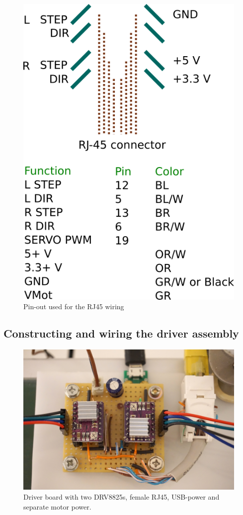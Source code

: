 \documentclass[a4paper,10pt]{article}
\begin{document}
\begin{figure}[h!]
  \centering
  \includegraphics[scale=.75]{img/pinout.png}
  \caption{Pin-out used for the RJ45 wiring}
  \label{fig:pinout}
\end{figure}

\subsection{Constructing and wiring the driver assembly}

\begin{figure}[h!]
  \centering
  \includegraphics{img/driverboard.jpg}
  \caption{Driver board with two DRV8825s, female RJ45, USB-power and separate motor power.}
  \label{fig:driverboard}
\end{figure}
\end{document}
